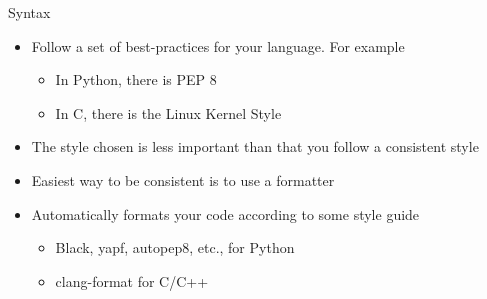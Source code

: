 \begin{frame}{Syntax}
    \begin{itemize}[<+->]
        \item Follow a set of best-practices for your language. For example
              \begin{itemize}[<+->]
                  \item In Python, there is PEP 8
                  \item In C, there is the Linux Kernel Style
              \end{itemize}
        \item The style chosen is less important than that you follow a consistent style
    \end{itemize}
    \pause
    \begin{multicols}{2}
        \pause
    \end{multicols}
    \begin{itemize}[<+->]
        \item Easiest way to be consistent is to use a formatter
        \item Automatically formats your code according to some style guide
              \begin{itemize}[<+->]
                  \item Black, yapf, autopep8, etc., for Python
                  \item clang-format for C/C++
              \end{itemize}
    \end{itemize}
\end{frame}

